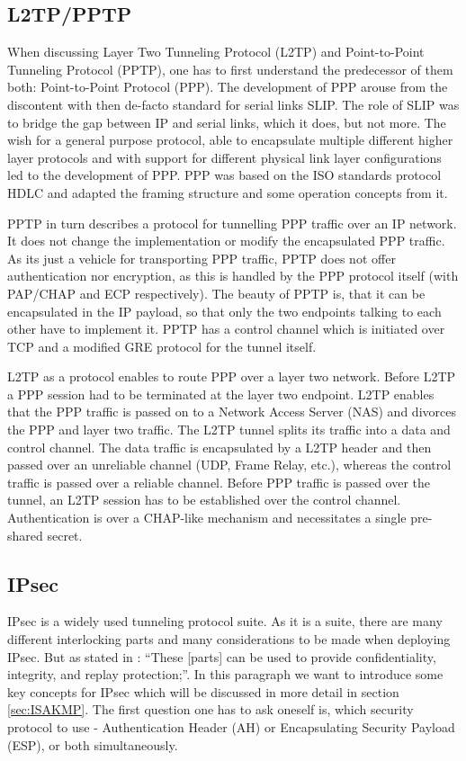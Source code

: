 \documentclass[a4paper]{report}
\begin{document}
\subsection{L2TP/PPTP}
\label{ssec:l2tppptp}
When discussing Layer Two Tunneling Protocol (L2TP) and Point-to-Point Tunneling Protocol (PPTP), one has to first understand the predecessor of them both: Point-to-Point Protocol (PPP).
The development of PPP arouse from the discontent with then de-facto standard for serial links SLIP. The role of SLIP was to bridge the gap between IP and serial links, which it does, but not more. The wish for a general purpose protocol, able to encapsulate multiple different higher layer protocols and with support for different physical link layer configurations led to the development of PPP. PPP was based on the ISO standards protocol HDLC and adapted the framing structure and some operation concepts from it.  \parencite{Kozierok2005}

PPTP in turn describes a protocol for tunnelling PPP traffic over an IP network. It does not change the implementation or modify the encapsulated PPP traffic. As its just a vehicle for transporting PPP traffic, PPTP does not offer authentication nor encryption, as this is handled by the PPP protocol itself (with PAP/CHAP and ECP respectively). The beauty of PPTP is, that it can be encapsulated in the IP payload, so that only the two endpoints talking to each other have to implement it. PPTP has a control channel which is initiated over TCP and a modified GRE protocol for the tunnel itself. \parencite{Hamzeh1999}

L2TP as a protocol enables to route PPP over a layer two network. Before L2TP a PPP session had to be terminated at the layer two endpoint. L2TP enables that the PPP traffic is passed on to a Network Access Server (NAS) and divorces the PPP and layer two traffic. The L2TP tunnel splits its traffic into a data and control channel. The data traffic is encapsulated by a L2TP header and then passed over an unreliable channel (UDP, Frame Relay, etc.), whereas the control traffic is passed over a reliable channel. Before PPP traffic is passed over the tunnel, an L2TP session has to be established over the control channel. Authentication is over a CHAP-like mechanism and necessitates a single pre-shared secret. \parencite{Townsley1999}



\subsection{IPsec}
\label{ssec:IPsec}
IPsec is a widely used tunneling protocol suite. As it is a suite, there are many different interlocking parts and many considerations to be made when deploying IPsec. But as stated in \cite{Bellovin2009}: \textquotedblleft These [parts] can be used to provide confidentiality, integrity, and replay protection;\textquotedblright.
In this paragraph we want to introduce some key concepts for IPsec which will be discussed in more detail in section \ref{sec:ISAKMP}.
The first question one has to ask oneself is, which security protocol to use - Authentication Header (AH) or Encapsulating Security Payload (ESP), or both simultaneously. 
\end{document}
